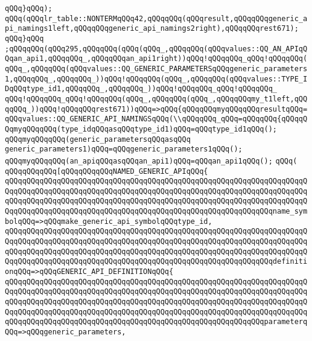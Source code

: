 \verb|qQQq}qQQq);|\newline
\verb|qQQq(qQQqlr_table::NONTERMqQQq42,qQQqqQQq(qQQqresult,qQQqqQQqgeneric_api_namings1left,qQQqqQQqgeneric_api_namings2right),qQQqqQQqrest671);|\newline
\verb|qQQq}qQQq|\newline
\verb|;qQQqqQQq(qQQq295,qQQqqQQq(qQQq(qQQq_,qQQqqQQq(qQQqvalues::QQ_AN_APIqQQqan_api1,qQQqqQQq_,qQQqqQQqan_api1right))qQQq!qQQqqQQq_qQQq!qQQqqQQq(qQQq_,qQQqqQQq(qQQqvalues::QQ_GENERIC_PARAMETERSqQQqgeneric_parameters1,qQQqqQQq_,qQQqqQQq_))qQQq!qQQqqQQq(qQQq_,qQQqqQQq(qQQqvalues::TYPE_IDqQQqtype_id1,qQQqqQQq_,qQQqqQQq_))qQQq!qQQqqQQq_qQQq!qQQqqQQq_|\newline
\verb|qQQq!qQQqqQQq_qQQq!qQQqqQQq(qQQq_,qQQqqQQq(qQQq_,qQQqqQQqmy_t1left,qQQqqQQq_))qQQq!qQQqqQQqrest671))qQQq=>qQQq{qQQqqQQqmyqQQqqQQqresultqQQq=qQQqvalues::QQ_GENERIC_API_NAMINGSqQQq(\\qQQqqQQq_qQQq=qQQqqQQq{qQQqqQQqmyqQQqqQQq(type_idqQQqasqQQqtype_id1)qQQq=qQQqtype_id1qQQq();|\newline
\verb|qQQqmyqQQqqQQq(generic_parametersqQQqasqQQq|\newline
\verb|generic_parameters1)qQQq=qQQqgeneric_parameters1qQQq();|\newline
\verb|qQQqmyqQQqqQQq(an_apiqQQqasqQQqan_api1)qQQq=qQQqan_api1qQQq();|\newline
\verb|qQQq(|\newline
\verb|qQQqqQQqqQQq[qQQqqQQqqQQqNAMED_GENERIC_APIqQQq{|\newline
\verb|qQQqqQQqqQQqqQQqqQQqqQQqqQQqqQQqqQQqqQQqqQQqqQQqqQQqqQQqqQQqqQQqqQQqqQQqqQQqqQQqqQQqqQQqqQQqqQQqqQQqqQQqqQQqqQQqqQQqqQQqqQQqqQQqqQQqqQQqqQQqqQQqqQQqqQQqqQQqqQQqqQQqqQQqqQQqqQQqqQQqqQQqqQQqqQQqqQQqqQQqqQQqqQQqqQQqqQQqqQQqqQQqqQQqqQQqqQQqqQQqqQQqqQQqqQQqqQQqqQQqqQQqqQQqqQQqname_symbolqQQq=>qQQqmake_generic_api_symbolqQQqtype_id,|\newline
\verb|qQQqqQQqqQQqqQQqqQQqqQQqqQQqqQQqqQQqqQQqqQQqqQQqqQQqqQQqqQQqqQQqqQQqqQQqqQQqqQQqqQQqqQQqqQQqqQQqqQQqqQQqqQQqqQQqqQQqqQQqqQQqqQQqqQQqqQQqqQQqqQQqqQQqqQQqqQQqqQQqqQQqqQQqqQQqqQQqqQQqqQQqqQQqqQQqqQQqqQQqqQQqqQQqqQQqqQQqqQQqqQQqqQQqqQQqqQQqqQQqqQQqqQQqqQQqqQQqqQQqqQQqqQQqqQQqdefinitionqQQq=>qQQqGENERIC_API_DEFINITIONqQQq{|\newline
\verb|qQQqqQQqqQQqqQQqqQQqqQQqqQQqqQQqqQQqqQQqqQQqqQQqqQQqqQQqqQQqqQQqqQQqqQQqqQQqqQQqqQQqqQQqqQQqqQQqqQQqqQQqqQQqqQQqqQQqqQQqqQQqqQQqqQQqqQQqqQQqqQQqqQQqqQQqqQQqqQQqqQQqqQQqqQQqqQQqqQQqqQQqqQQqqQQqqQQqqQQqqQQqqQQqqQQqqQQqqQQqqQQqqQQqqQQqqQQqqQQqqQQqqQQqqQQqqQQqqQQqqQQqqQQqqQQqqQQqqQQqqQQqqQQqqQQqqQQqqQQqqQQqqQQqqQQqqQQqqQQqqQQqqQQqqQQqqQQqqQQqparameterqQQq=>qQQqgeneric_parameters,|\newline
